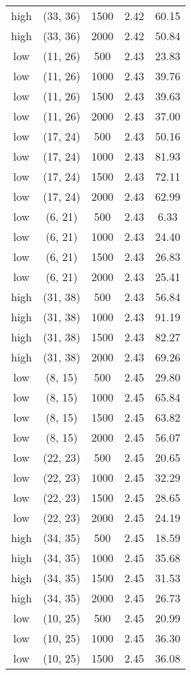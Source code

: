 \begin{tabular}{c c c c c}
high & (33, 36) &  1500 & 2.42 & 60.15 \\
high & (33, 36) &  2000 & 2.42 & 50.84 \\
low & (11, 26) &  500 & 2.43 & 23.83 \\
low & (11, 26) &  1000 & 2.43 & 39.76 \\
low & (11, 26) &  1500 & 2.43 & 39.63 \\
low & (11, 26) &  2000 & 2.43 & 37.00 \\
low & (17, 24) &  500 & 2.43 & 50.16 \\
low & (17, 24) &  1000 & 2.43 & 81.93 \\
low & (17, 24) &  1500 & 2.43 & 72.11 \\
low & (17, 24) &  2000 & 2.43 & 62.99 \\
low & (6, 21) &  500 & 2.43 & 6.33 \\
low & (6, 21) &  1000 & 2.43 & 24.40 \\
low & (6, 21) &  1500 & 2.43 & 26.83 \\
low & (6, 21) &  2000 & 2.43 & 25.41 \\
high & (31, 38) &  500 & 2.43 & 56.84 \\
high & (31, 38) &  1000 & 2.43 & 91.19 \\
high & (31, 38) &  1500 & 2.43 & 82.27 \\
high & (31, 38) &  2000 & 2.43 & 69.26 \\
low & (8, 15) &  500 & 2.45 & 29.80 \\
low & (8, 15) &  1000 & 2.45 & 65.84 \\
low & (8, 15) &  1500 & 2.45 & 63.82 \\
low & (8, 15) &  2000 & 2.45 & 56.07 \\
low & (22, 23) &  500 & 2.45 & 20.65 \\
low & (22, 23) &  1000 & 2.45 & 32.29 \\
low & (22, 23) &  1500 & 2.45 & 28.65 \\
low & (22, 23) &  2000 & 2.45 & 24.19 \\
high & (34, 35) &  500 & 2.45 & 18.59 \\
high & (34, 35) &  1000 & 2.45 & 35.68 \\
high & (34, 35) &  1500 & 2.45 & 31.53 \\
high & (34, 35) &  2000 & 2.45 & 26.73 \\
low & (10, 25) &  500 & 2.45 & 20.99 \\
low & (10, 25) &  1000 & 2.45 & 36.30 \\
low & (10, 25) &  1500 & 2.45 & 36.08 \\

\end{tabular}
